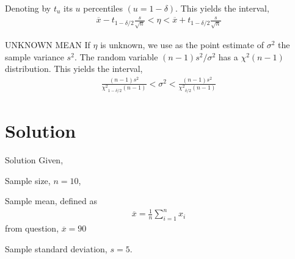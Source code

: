 \documentclass{beamer}
\begin{document}
\begin{frame}
   \begin{block}{}
      Denoting by $t_u$ its $u$ percentiles $(u=1-\delta)$. This yields the interval, 
      \begin{align}
        \overline{x} - t_{1- \delta/2} \frac{s}{\sqrt{n}} < \eta <  \overline{x} + t_{1- \delta/2} \frac{s}{\sqrt{n}}   \label{eq3}
	  \end{align} 
	        
   \end{block}
   
   \begin{block}{UNKNOWN MEAN}
      If $\eta$ is unknown, we use as the point estimate of $\sigma^2$ the sample variance $s^2$. The random variable $(n-1) s^2/\sigma^2$ has a $\chi^2 (n-1)$ distribution. This yields the interval,
      \begin{align}
        \frac{(n-1) s^2}{{\chi^2}_{1- \delta/2} (n-1)} < \sigma^2 < \frac{(n-1) s^2}{{\chi^2}_{\delta/2} (n-1)}  \label{eq4}
      \end{align}
 
   \end{block}
   
\end{frame}

\section{Solution}
\begin{frame}{Solution}
	Given,
	
	  Sample size, $n = 10$,
	  
      Sample mean, defined as
      \begin{align}
         \overline{x} = \frac{1}{n} \sum_{i=1}^{n} x_i
      \end{align}
       from question, $\overline{x} = 90$ 
	  
	 Sample standard deviation, $s = 5$.

      
\end{frame}
\end{document}
